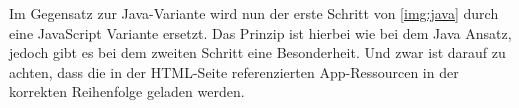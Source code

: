 \label{sec:ansatz-javascript}
Im Gegensatz zur Java-Variante wird nun der erste Schritt von \autoref{img:java} durch eine JavaScript Variante ersetzt. Das Prinzip ist hierbei wie bei dem Java Ansatz, jedoch gibt es bei dem zweiten Schritt eine Besonderheit. Und zwar ist darauf zu achten, dass die in der HTML-Seite referenzierten App-Ressourcen in der korrekten Reihenfolge geladen werden.

\missingtext